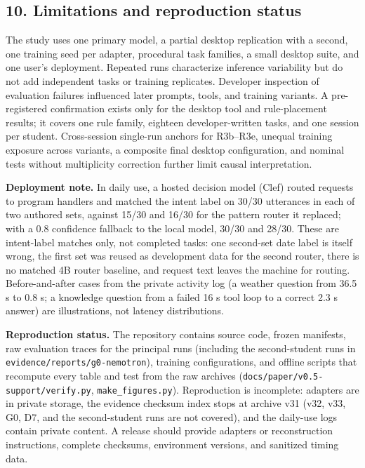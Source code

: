 \documentclass[
  10pt,
]{article}
\begin{document}
\subsection{10. Limitations and reproduction
status}\label{limitations-and-reproduction-status}

The study uses one primary model, a partial desktop replication with a
second, one training seed per adapter, procedural task families, a small
desktop suite, and one user's deployment. Repeated runs characterize
inference variability but do not add independent tasks or training
replicates. Developer inspection of evaluation failures influenced later
prompts, tools, and training variants. A pre-registered confirmation
exists only for the desktop tool and rule-placement results; it covers
one rule family, eighteen developer-written tasks, and one session per
student. Cross-session single-run anchors for R3b--R3e, unequal training
exposure across variants, a composite final desktop configuration, and
nominal tests without multiplicity correction further limit causal
interpretation.

\textbf{Deployment note.} In daily use, a hosted decision model (Clef)
routed requests to program handlers and matched the intent label on
30/30 utterances in each of two authored sets, against 15/30 and 16/30
for the pattern router it replaced; with a 0.8 confidence fallback to
the local model, 30/30 and 28/30. These are intent-label matches only,
not completed tasks: one second-set date label is itself wrong, the
first set was reused as development data for the second router, there is
no matched 4B router baseline, and request text leaves the machine for
routing. Before-and-after cases from the private activity log (a weather
question from 36.5 s to 0.8 s; a knowledge question from a failed 16 s
tool loop to a correct 2.3 s answer) are illustrations, not latency
distributions.

\textbf{Reproduction status.} The repository contains source code,
frozen manifests, raw evaluation traces for the principal runs
(including the second-student runs in
\texttt{evidence/reports/g0-nemotron}), training configurations, and
offline scripts that recompute every table and test from the raw
archives (\texttt{docs/paper/v0.5-support/verify.py},
\texttt{make\_figures.py}). Reproduction is incomplete: adapters are in
private storage, the evidence checksum index stops at archive v31 (v32,
v33, G0, D7, and the second-student runs are not covered), and the
daily-use logs contain private content. A release should provide
adapters or reconstruction instructions, complete checksums, environment
versions, and sanitized timing data.
\end{document}
